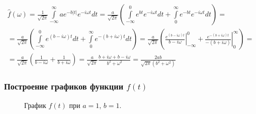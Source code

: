 \documentclass[a5paper, 10pt]{article}
\theoremstyle{definition}
\theoremstyle{plain}
\theoremstyle{remark}
\begin{document}
\begin{multline}
\hat{f}(\omega) =
 \frac{1}{\sqrt{2 \pi}} \int \limits_{-\infty}^{\infty} a e^{-b|t|} e^{-i \omega t} dt =  \frac{a}{\sqrt{2 \pi}}  \left( \int \limits_{-\infty}^{0} e^{b t} e^{-i \omega t} dt  + \int \limits_{0}^{\infty} e^{-b t} e^{-i \omega t} dt  \right) = \\
=  \frac{a}{\sqrt{2 \pi}}  \left( \int \limits_{-\infty}^{0} e^{(b-i \omega) t} dt  + \int \limits_{0}^{\infty}e^{-(b + i \omega) t} dt  \right) 
= \frac{a}{\sqrt{2 \pi}}  \left(  \left. \frac{e^{(b-i \omega) t}}{b-i \omega} \right|_{-\infty}^{0} + \left. \frac{e^{-(b + i \omega) t}}{-(b + i \omega)} \right|_{0}^{\infty}  \right) =\\
=\frac{a}{\sqrt{2 \pi}}  \left( \frac{1}{b-i \omega} + \frac{1}{b + i \omega}  \right) =
\frac{a}{\sqrt{2 \pi}}   \frac{b + i \omega +b - i \omega}{b^2 + \omega^2} = \frac{2ab}{\sqrt{2 \pi} (b^2 + \omega^2)}
\end{multline}

\subsubsection{Построение графиков функции $f(t)$}

\begin{figure}[h!]
\caption{График $f(t)$ при $a = 1$, $b = 1$.}
\end{figure}
\end{document}
